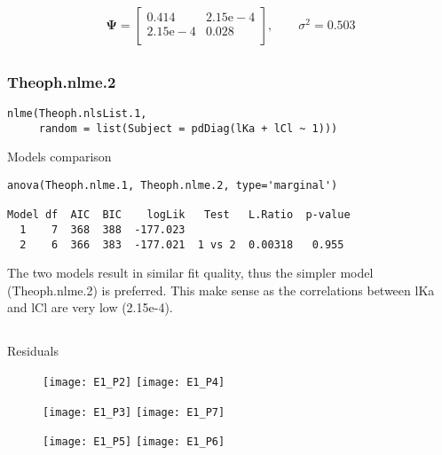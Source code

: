 \documentclass[a4paper,12pt]{article}
\begin{document}
	
	\newpage
	\subsection{}
	\begin{equation*}
		\boldsymbol{\Psi} = \begin{bmatrix}
		0.414 & 2.15\text{e}-4 \\
		2.15\text{e}-4 & 0.028 \\
		\end{bmatrix},
		\qquad
		\sigma^2 = 0.503
	\end{equation*}
	
	\subsection{}
	\subsubsection*{Theoph.nlme.2}
	\begin{lstlisting}
nlme(Theoph.nlsList.1,
     random = list(Subject = pdDiag(lKa + lCl ~ 1)))
	\end{lstlisting}
	Models comparison
	\begin{lstlisting}
anova(Theoph.nlme.1, Theoph.nlme.2, type='marginal')

Model df  AIC  BIC    logLik   Test   L.Ratio  p-value
  1    7  368  388  -177.023                           
  2    6  366  383  -177.021  1 vs 2  0.00318   0.955
	\end{lstlisting}
	The two models result in similar fit quality, thus the simpler model (Theoph.nlme.2) is preferred. This make sense as the correlations between lKa and lCl are very low (2.15e-4).
	
	\newpage
	\subsection{}
	Residuals
	\begin{figure}[h!]
		\texttt{[image: E1\_P2]}
		\texttt{[image: E1\_P4]}
	\end{figure}
	
	\begin{figure}[h!]
		\texttt{[image: E1\_P3]}
		\texttt{[image: E1\_P7]}
	\end{figure}

	\begin{figure}[h!]
		\texttt{[image: E1\_P5]}
		\texttt{[image: E1\_P6]}
	\end{figure}
\end{document}
